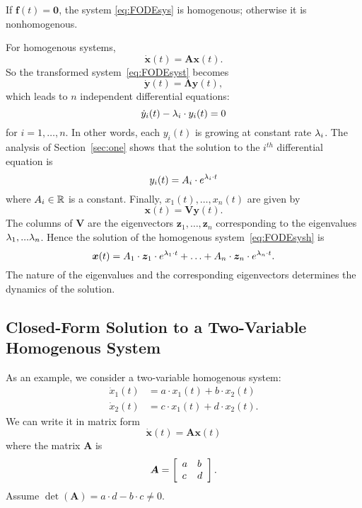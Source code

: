 \documentclass[letterpaper,12pt,leqno]{article}
\begin{document}
If $\bm{f}(t) =\bm{0}$, the system \eqref{eq:FODEsys} is homogenous; otherwise it is nonhomogenous. 

For homogenous systems, 
\begin{equation}
\bm{\dot{x}}(t) =\bm{A} \bm{x}(t).\label{eq:FODEsysh}
\end{equation}
So the transformed system~\eqref{eq:FODEsyst} becomes 
\begin{equation*}
\bm{\dot{y}}(t) =\bm{\Lambda}\bm{y}(t) ,
\end{equation*}
which leads to $n$ independent differential equations:
\begin{equation*}
\dot{y}_{i}(t) -\lambda_{i} \cdot y_{i}(t)=0
\end{equation*}
for $i=1,\ldots,n$. In other words, each $y_{i}(t) $ is growing at constant rate $\lambda_{i}$. The analysis of Section~\ref{sec:one} shows that the solution to the $i^{th}$ differential equation is 
\begin{equation*}
y_{i}(t) =A_{i}\cdot e^{\lambda_{i}\cdot t}
\end{equation*}
where $A_{i}\in \mathbb{R}$ is a constant. Finally, $x_{1}(t),\ldots,x_{n}(t)$ are given by
\begin{equation*}
\bm{x}(t) =\bm{V} \bm{y}(t) .
\end{equation*}
The columns of $\bm{V}$ are the eigenvectors $\bm{z}_{1},\ldots,\bm{z}_{n}$ corresponding to the
eigenvalues $\lambda_{1},...\lambda_{n}$. Hence the solution of the homogenous system~\eqref{eq:FODEsysh} is 
\begin{equation}
\bm{x}(t) =A_{1}\cdot \bm{z}_{1} \cdot e^{\lambda_{1}\cdot t}+\ldots+A_{n}\cdot \bm{z}_{n}\cdot e^{\lambda_{n}\cdot t}.\label{eq:SOLEV}
\end{equation}
The nature of the eigenvalues and the corresponding eigenvectors determines
the dynamics of the solution. 

\subsection{Closed-Form Solution to a Two-Variable Homogenous System}

As an example, we consider a two-variable homogenous system:
\begin{align*}
\dot{x}_{1}(t) &=a\cdot x_{1}(t)+b\cdot x_{2}(t) \\
\dot{x}_{2}(t) &=c\cdot x_{1}(t)+d\cdot x_{2}(t).
\end{align*}
We can write it in matrix form
\begin{equation*}
\bm{\dot{x}}(t) =\bm{A} \bm{x}(t)
\end{equation*}
where the matrix $\bm{A}$ is 
\begin{equation*}
\bm{A}=\left[ 
\begin{array}{ll}
a & b \\ 
c & d
\end{array} \right].
\end{equation*}
Assume $\det(\bm{A}) =a\cdot d-b\cdot c\neq 0. $
\end{document}
